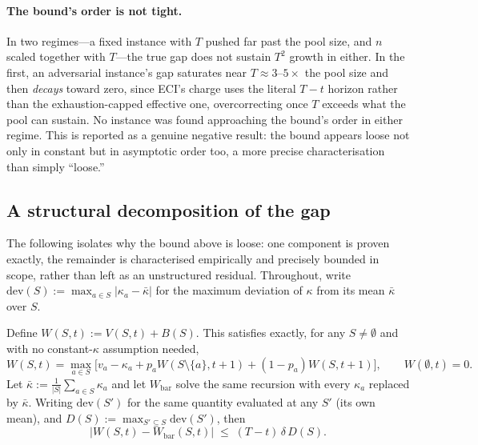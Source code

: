 \paragraph{The bound's order is not tight.} In two regimes---a fixed instance with
$T$ pushed far past the pool size, and $n$ scaled together with $T$---the true
gap does not sustain $T^2$
growth in either. In the first, an adversarial instance's gap saturates near
$T\approx3$--$5\times$ the pool size and then \emph{decays} toward zero, since
ECI's charge uses the literal $T-t$ horizon rather than the
exhaustion-capped effective one, overcorrecting once $T$ exceeds what the pool
can sustain. No instance was found approaching the bound's order in either
regime. This is reported as a genuine negative result: the bound appears loose
not only in constant but in asymptotic order too, a more precise
characterisation than simply ``loose.''

\subsection{A structural decomposition of the gap}

The following isolates why the bound above is loose: one component is proven
exactly, the remainder is characterised empirically and precisely bounded in
scope, rather than left as an unstructured residual. Throughout, write
$\mathrm{dev}(S) := \max_{a\in S}|\kappa_a-\bar\kappa|$ for the maximum
deviation of $\kappa$ from its mean $\bar\kappa$ over $S$.

\begin{lemma}
\label{lem:compcoupling}
Define $W(S,t) := V(S,t) + B(S)$. This satisfies exactly, for any $S\neq\emptyset$
and with no constant-$\kappa$ assumption needed,
\[
W(S,t) = \max_{a\in S}\big[v_a - \kappa_a + p_aW(S{\setminus}\{a\},t{+}1) +
(1-p_a)W(S,t{+}1)\big], \qquad W(\emptyset,t)=0.
\]
Let $\bar\kappa := \frac{1}{|S|}\sum_{a\in S}\kappa_a$ and let $W_{\mathrm{bar}}$
solve the same recursion with every $\kappa_a$ replaced by $\bar\kappa$.
Writing $\mathrm{dev}(S')$ for the same quantity evaluated at any $S'$ (its
own mean), and $D(S):=\max_{S'\subseteq S}\mathrm{dev}(S')$, then
\[
|W(S,t) - W_{\mathrm{bar}}(S,t)| \;\le\; (T-t)\,\delta\, D(S).
\]
\end{lemma}

